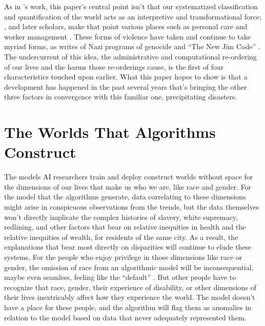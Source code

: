 \documentclass[manuscript,screen]{acmart}
\begin{document}
As in \citeauthor{scott1998seeing}'s work, this paper's central point isn't that our systematized classification and quantification of the world acts as an interpretive and transformational force;
\citeauthor{bowker2000sorting}, and later scholars, make that point various places such as personal care
\cite{10.1145/3274362} and worker management
\cite{turkopticon}.
These forms of violence have taken and continue to take myriad forms, as \citeauthor{hoffmann2020terms} writes of Nazi programs of genocide and ``The New Jim Code''
\cite{hoffmann2020terms}.
The undercurrent of this idea, the administrative and computational re-ordering of our lives and the harms those re-orderings cause, is the first of four characteristics \citeauthor{scott1998seeing} touched upon earlier.
What this paper hopes to show is that a development has happened in the past several years that's bringing the other three factors in convergence with this familiar one, precipitating disasters.

\section{The Worlds That Algorithms Construct}

The models AI researchers train and deploy construct worlds without space for the dimensions of our lives that make us who we are, like race and gender.
For the model that the algorithms generate, data correlating to these dimensions might arise in conspicuous observations from the trends, but the data themselves won't directly implicate the complex histories of slavery, white supremacy, redlining, and other factors that bear on relative inequities in health and the relative inequities of wealth, for residents of the same city.
As a result, the explanations that bear most directly on disparities will continue to elude these systems.
For the people who enjoy privilege in those dimensions like race or gender, the omission of race from an algorithmic model will be inconsequential, maybe even seamless, feeling like the ``default''
\cite{sweeney2019technically}.
But other people have to recognize that race, gender, their experience of disability, or other dimensions of their lives inextricably affect how they experience the world.
The model doesn't have a place for these people, and the algorithm will flag them as anomalies in relation to the model based on data that never adequately represented them.
\end{document}
